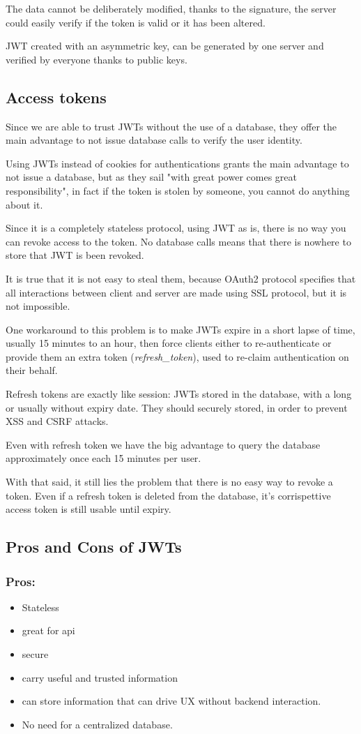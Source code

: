 \documentclass[11pt]{style}
\begin{document}
The data cannot be deliberately modified, thanks to the signature, the server
could easily verify if the token is valid or it has been altered.

JWT created with an asymmetric key, can be generated by one server and verified
by everyone thanks to public keys.

\subsection{Access tokens}
Since we are able to trust JWTs  without the use of a database, they offer the
main advantage to not issue database calls to verify the user identity.


Using JWTs instead of cookies for authentications grants the main advantage to
not issue a database, but as they sail "with great power comes great
responsibility", in fact if the token is stolen by someone, you cannot do
anything about it.

Since it is a completely stateless protocol, using JWT as is, there is no way
you can revoke access to the token. No database calls means that there is
nowhere to store that JWT is been revoked.

It is true that it is not easy to steal them, because OAuth2 protocol specifies
that all interactions between client and server are made using SSL protocol, but
it is not impossible.

One workaround to this problem is to make JWTs expire in a short lapse of time,
usually 15 minutes to an hour, then force clients either to re-authenticate or
provide them an extra token (\textit{refresh\_token}), used to re-claim
authentication on their behalf.

Refresh tokens are exactly like session: JWTs stored in the database, with a
long or usually without expiry date.
They should securely stored, in order to prevent XSS and CSRF attacks.

Even with refresh token we have the big advantage to query the database
approximately once each 15 minutes per user.

With that said, it still lies the problem that there is no easy way to revoke a
token. Even if a refresh token is deleted from the database, it's corrispettive
access token is still usable until expiry.

\subsection{Pros and Cons of JWTs}
\subsubsection{Pros:}
\begin{itemize}
    \item Stateless
    \item great for api
    \item secure
    \item carry useful and trusted information
    \item can store information that can drive UX without backend interaction.
    \item No need for a centralized database.
\end{itemize}
\end{document}
